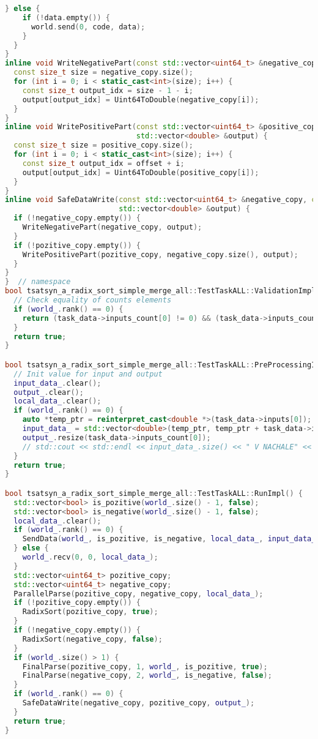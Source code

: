 \documentclass[a4paper,12pt]{article}
\begin{document}
\begin{lstlisting}[language=C++,
    breaklines=true,       % Автоматический перенос строк
    basicstyle=\small\ttfamily, % Уменьшенный шрифт
    columns=fullflexible ]
  } else {
    if (!data.empty()) {
      world.send(0, code, data);
    }
  }
}
inline void WriteNegativePart(const std::vector<uint64_t> &negative_copy, std::vector<double> &output) {
  const size_t size = negative_copy.size();
  for (int i = 0; i < static_cast<int>(size); i++) {
    const size_t output_idx = size - 1 - i;
    output[output_idx] = Uint64ToDouble(negative_copy[i]);
  }
}
inline void WritePositivePart(const std::vector<uint64_t> &positive_copy, const size_t offset,
                              std::vector<double> &output) {
  const size_t size = positive_copy.size();
  for (int i = 0; i < static_cast<int>(size); i++) {
    const size_t output_idx = offset + i;
    output[output_idx] = Uint64ToDouble(positive_copy[i]);
  }
}
inline void SafeDataWrite(const std::vector<uint64_t> &negative_copy, const std::vector<uint64_t> &pozitive_copy,
                          std::vector<double> &output) {
  if (!negative_copy.empty()) {
    WriteNegativePart(negative_copy, output);
  }
  if (!pozitive_copy.empty()) {
    WritePositivePart(pozitive_copy, negative_copy.size(), output);
  }
}
}  // namespace
bool tsatsyn_a_radix_sort_simple_merge_all::TestTaskALL::ValidationImpl() {
  // Check equality of counts elements
  if (world_.rank() == 0) {
    return (task_data->inputs_count[0] != 0) && (task_data->inputs_count[0] == task_data->outputs_count[0]);
  }
  return true;
}

bool tsatsyn_a_radix_sort_simple_merge_all::TestTaskALL::PreProcessingImpl() {
  // Init value for input and output
  input_data_.clear();
  output_.clear();
  local_data_.clear();
  if (world_.rank() == 0) {
    auto *temp_ptr = reinterpret_cast<double *>(task_data->inputs[0]);
    input_data_ = std::vector<double>(temp_ptr, temp_ptr + task_data->inputs_count[0]);
    output_.resize(task_data->inputs_count[0]);
    // std::cout << std::endl << input_data_.size() << " V NACHALE" << std::endl;
  }
  return true;
}

bool tsatsyn_a_radix_sort_simple_merge_all::TestTaskALL::RunImpl() {
  std::vector<bool> is_pozitive(world_.size() - 1, false);
  std::vector<bool> is_negative(world_.size() - 1, false);
  local_data_.clear();
  if (world_.rank() == 0) {
    SendData(world_, is_pozitive, is_negative, local_data_, input_data_);
  } else {
    world_.recv(0, 0, local_data_);
  }
  std::vector<uint64_t> pozitive_copy;
  std::vector<uint64_t> negative_copy;
  ParallelParse(pozitive_copy, negative_copy, local_data_);
  if (!pozitive_copy.empty()) {
    RadixSort(pozitive_copy, true);
  }
  if (!negative_copy.empty()) {
    RadixSort(negative_copy, false);
  }
  if (world_.size() > 1) {
    FinalParse(pozitive_copy, 1, world_, is_pozitive, true);
    FinalParse(negative_copy, 2, world_, is_negative, false);
  }
  if (world_.rank() == 0) {
    SafeDataWrite(negative_copy, pozitive_copy, output_);
  }
  return true;
}


\end{lstlisting}
\end{document}
